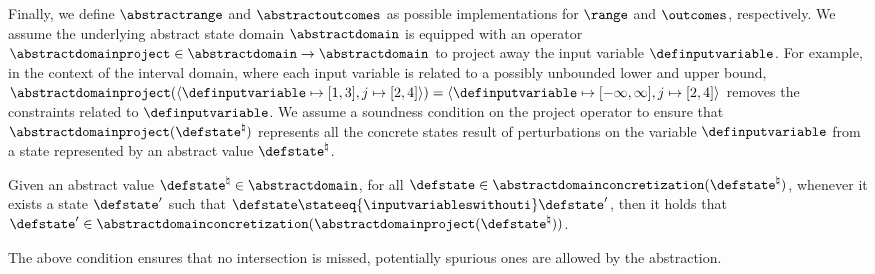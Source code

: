 Finally,
we define $\abstractrange$ and $\abstractoutcomes$
as possible implementations for $\range$ and $\outcomes$, respectively.
%
We assume the underlying abstract state domain $\abstractdomain$ is equipped with an
operator $\abstractdomainproject\in\abstractdomain\to\abstractdomain$
to project away the input variable $\definputvariable$.
For example, in the context of the interval domain, where each input variable is related to a possibly unbounded lower and upper bound, $\abstractdomainproject(\langle\definputvariable \mapsto [1, 3], j \mapsto [2, 4]\rangle) = \langle \definputvariable \mapsto [-\infty, \infty], j \mapsto [2, 4] \rangle$
removes the constraints related to $\definputvariable$.
%
We assume a soundness condition on the project operator to ensure that $\abstractdomainproject(\defstate^\natural)$ represents all the concrete states result of perturbations on the variable $\definputvariable$ from a state represented by an abstract value $\defstate^\natural$.

\begin{definition}
  Given an abstract value $\defstate^\natural\in\abstractdomain$, for all $\defstate \in \abstractdomainconcretization(\defstate^\natural)$, whenever it exists a state $\defstate'$ such that $\defstate \stateeq{\inputvariableswithouti} \defstate'$, then it holds that $\defstate' \in \abstractdomainconcretization(\abstractdomainproject(\defstate^\natural))$.
\end{definition}
The above condition ensures that no intersection is missed, potentially spurious ones are allowed by the abstraction.

